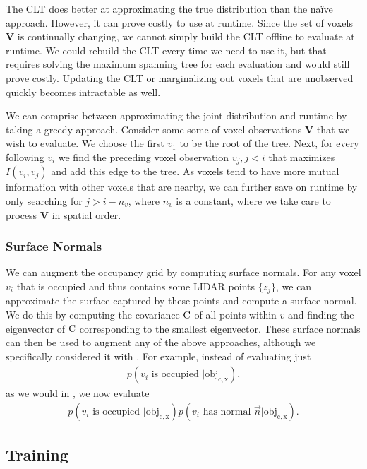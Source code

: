 The \ac{CLT} does better at approximating the true distribution than the na\"ive
approach. However, it can prove costly to use at runtime. Since the set of
voxels $\mathbf{V}$ is continually changing, we cannot simply build the \ac{CLT}
offline to evaluate at runtime. We could rebuild the \ac{CLT} every time we need
to use it, but that requires solving the maximum spanning tree for each
evaluation and would still prove costly. Updating the \ac{CLT} or marginalizing
out voxels that are unobserved quickly becomes intractable as well.

We can comprise between approximating the joint distribution and runtime by
taking a greedy approach. Consider some some of voxel observations $\mathbf{V}$
that we wish to evaluate. We choose the first $v_1$ to be the root of the tree.
Next, for every following $v_i$ we find the preceding voxel observation $v_j, j
< i$ that maximizes $I(v_i, v_j)$ and add this edge to the tree. As voxels tend
to have more mutual information with other voxels that are nearby, we can
further save on runtime by only searching for $j > i - n_v$, where $n_v$ is a
constant, where we take care to process $\mathbf{V}$ in spatial order.

\subsubsection{Surface Normals} \label{sec:normals}

We can augment the occupancy grid by computing surface normals. For any voxel
$v_i$ that is occupied and thus contains some \ac{LIDAR} points $\{z_j\}$, we
can approximate the surface captured by these points and compute a surface
normal. We do this by computing the covariance $\mathrm{C}$ of all points within
$v$ and finding the eigenvector of $\mathrm{C}$ corresponding to the smallest
eigenvector. These surface normals can then be used to augment
any of the above approaches, although we specifically considered it with
. For example, instead of evaluating just
%
\begin{align}
  p(v_i \text{ is occupied } | \mathrm{obj_{c,x}}) \text{,}
\end{align}
%
as we would in , we now evaluate
%
\begin{align}
  p(v_i \text{ is occupied } | \mathrm{obj_{c,x}}) p(v_i \text{ has normal } \vec{n}
  | \mathrm{obj_{c, x}}) \text{.}
\end{align}

\subsection{Training}

